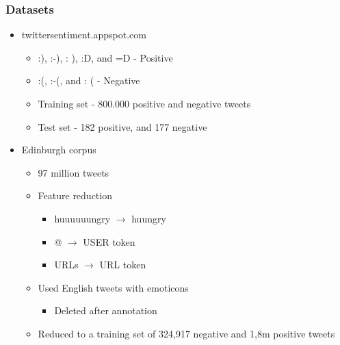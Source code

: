 \begin{frame}
        \frametitle{Datasets}
        \begin{itemize}
        	\item twittersentiment.appspot.com
        	\begin{itemize}
        		\item :), :-), : ), :D, and =D - Positive
        		\item :(, :-(, and : ( - Negative
        		\item Training set - 800.000 positive and negative tweets
        		\item Test set - 182 positive, and 177 negative
        	\end{itemize}
        	\item Edinburgh corpus
        	\begin{itemize}
        		\item 97 million tweets
        		\item Feature reduction
	        	\begin{itemize}
	        		\item huuuuuungry $\rightarrow$ huungry
	        		\item @ $\rightarrow$ USER token
	        		\item URLs $\rightarrow$ URL token
	        	\end{itemize}
        		\item Used English tweets with emoticons
        		\begin{itemize}
        			\item Deleted after annotation
        		\end{itemize}
        		\item Reduced to a training set of 324,917 negative and 1,8m positive tweets
        	\end{itemize}
        \end{itemize}
\end{frame}